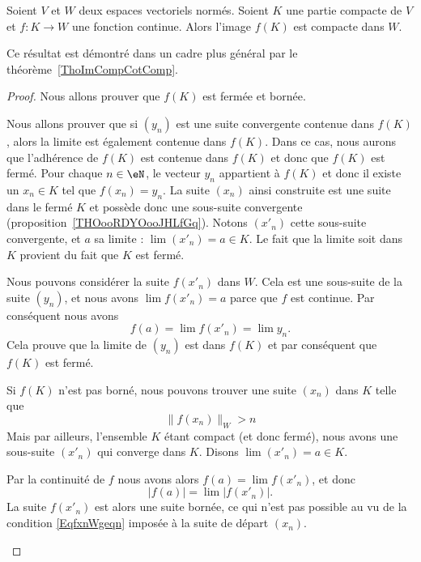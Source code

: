 \begin{proposition}		\label{PropContinueCompactBorne}
	Soient \( V\) et \( W\) deux espaces vectoriels normés. Soient \( K\) une partie compacte de \( V\) et \( f\colon K\to W\) une fonction continue. Alors l'image \( f(K)\) est compacte dans \( W\).
\end{proposition}
Ce résultat est démontré dans un cadre plus général par le théorème~\ref{ThoImCompCotComp}.

\begin{proof}
	Nous allons prouver que \( f(K)\) est fermée et bornée.
	\begin{subproof}
		 Nous allons prouver que si \( (y_n)\) est une suite convergente contenue dans \( f(K)\), alors la limite est également contenue dans \( f(K)\). Dans ce cas, nous aurons que l'adhérence de \( f(K)\) est contenue dans \( f(K)\) et donc que \( f(K)\) est fermé. Pour chaque \( n\in\eN\), le vecteur \( y_n\) appartient à \( f(K)\) et donc il existe un \( x_n\in K\) tel que \( f(x_n)=y_n\). La suite \( (x_n)\) ainsi construite est une suite dans le fermé \( K\) et possède donc une sous-suite convergente (proposition~\ref{THOooRDYOooJHLfGq}). Notons \( (x'_n)\) cette sous-suite convergente, et \( a\) sa limite : \( \lim(x'_n)=a\in K\). Le fait que la limite soit dans \( K\) provient du fait que \( K\) est fermé.

		Nous pouvons considérer la suite \( f(x'_n)\) dans \( W\). Cela est une sous-suite de la suite \( (y_n)\), et nous avons \( \lim f(x'_n)=a\) parce que \( f\) est continue. Par conséquent nous avons
		\begin{equation}
			f(a)=\lim f(x'_n)=\lim y_n.
		\end{equation}
		Cela prouve que la limite de \( (y_n)\) est dans \( f(K)\) et par conséquent que \( f(K)\) est fermé.

		Si \( f(K)\) n'est pas borné, nous pouvons trouver une suite \( (x_n)\) dans \( K\) telle que
		\begin{equation}		\label{EqfxnWgeqn}
			\| f(x_n) \|_W>n
		\end{equation}
		Mais par ailleurs, l'ensemble \( K\) étant compact (et donc fermé), nous avons une sous-suite \( (x'_n)\) qui converge dans \( K\). Disons \( \lim(x'_n)=a\in K\).

		Par la continuité de \( f\) nous avons alors \( f(a)=\lim f(x'_n)\), et donc
		\begin{equation}
			| f(a) |=\lim | f(x'_n) |.
		\end{equation}
		La suite \( f(x'_n)\) est alors une suite bornée, ce qui n'est pas possible au vu de la condition \eqref{EqfxnWgeqn} imposée à la suite de départ \( (x_n)\).
	\end{subproof}
\end{proof}

